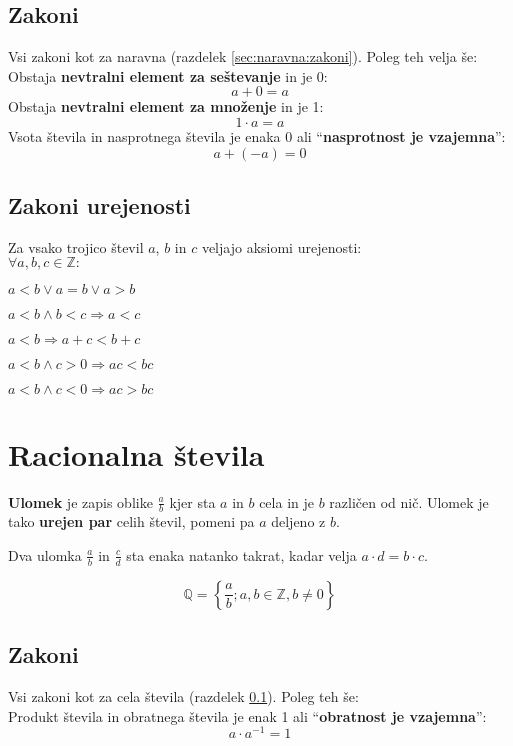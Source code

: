 \documentclass[a4paper,oneside,12pt,fleqn]{article}
\def\Z{\ensuremath{\mathbb Z}}
\def\Q{\ensuremath{\mathbb Q}}
\newcommand\krat\cdot
\renewcommand\implies\Rightarrow
\numberwithin{equation}{section}
\newenvironment{enumerate*}%
{
\vspace{-12pt}%
\begin{enumerate}%
\setlength{\itemsep}{0pt}%
\setlength{\parskip}{2pt}}%
{\end{enumerate}}
\begin{document}
\subsection{Zakoni}
\label{sec:cela:zakoni}
Vsi zakoni kot za naravna (razdelek \ref{sec:naravna:zakoni}). Poleg teh velja še: \\
Obstaja \textbf{nevtralni element za seštevanje} in je 0:
\[ a + 0 = a \]
Obstaja \textbf{nevtralni element za množenje} in je 1:
\[ 1 \krat a = a \]
Vsota števila in nasprotnega števila je enaka 0 ali ``\textbf{nasprotnost je vzajemna}'':
\[ a + (-a) = 0 \]

\subsection{Zakoni urejenosti}
\label{sec:cela:zakoniurejenosti}
Za vsako trojico števil $a$, $b$ in $c$ veljajo aksiomi urejenosti: \\
$\forall a, b, c \in \Z \colon$
\begin{enumerate*}
  \item $a < b \lor a = b \lor a > b$
  \item $a < b \land b < c \implies a < c$
  \item $a < b \implies a + c < b + c$
  \item $a < b \land c > 0 \implies ac < bc$
  \item $a < b \land c < 0 \implies ac > bc$
\end{enumerate*}

\section{Racionalna števila}
\label{sec:rac}
\textbf{Ulomek} je zapis oblike $\frac{a}{b}$ kjer sta $a$ in $b$ cela in je $b$ različen od nič. Ulomek je
tako \textbf{urejen par} celih števil, pomeni pa $a$ deljeno z $b$.

Dva ulomka $\frac{a}{b}$ in $\frac{c}{d}$ sta enaka natanko takrat, kadar velja $a \krat d = b \krat
c$.

\[ \Q = \left\{\frac{a}{b}; a,b \in \Z, b \neq 0 \right\} \]

\subsection{Zakoni}
Vsi zakoni kot za cela števila (razdelek \ref{sec:cela:zakoni}). Poleg teh še: \\
Produkt števila in obratnega števila je enak 1 ali ``\textbf{obratnost je vzajemna}'':
\[ a \krat a^{-1} = 1 \]
\end{document}
